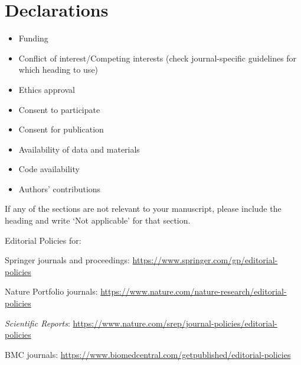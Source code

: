 \documentclass[default,iicol]{sn-jnl}%
\theoremstyle{thmstyleone}%
\theoremstyle{thmstyletwo}%
\theoremstyle{thmstylethree}%
\begin{document}
\section*{Declarations}


\begin{itemize}
\item Funding
\item Conflict of interest/Competing interests (check journal-specific guidelines for which heading to use)
\item Ethics approval
\item Consent to participate
\item Consent for publication
\item Availability of data and materials
\item Code availability
\item Authors' contributions
\end{itemize}

\noindent
If any of the sections are not relevant to your manuscript, please include the heading and write `Not applicable' for that section.

\bigskip
\begin{flushleft}%
Editorial Policies for:

\bigskip\noindent
Springer journals and proceedings: \url{https://www.springer.com/gp/editorial-policies}

\bigskip\noindent
Nature Portfolio journals: \url{https://www.nature.com/nature-research/editorial-policies}

\bigskip\noindent
\textit{Scientific Reports}: \url{https://www.nature.com/srep/journal-policies/editorial-policies}

\bigskip\noindent
BMC journals: \url{https://www.biomedcentral.com/getpublished/editorial-policies}
\end{flushleft}
\end{document}
